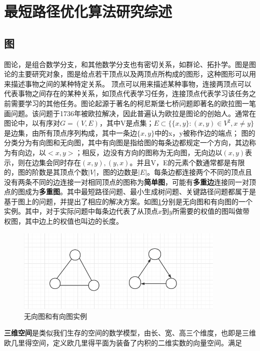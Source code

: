 \setcounter{table}{0}
\setcounter{figure}{0}
\section{最短路径优化算法研究综述}

\subsection{图}
\par 图论，是组合数学分支，和其他数学分支也有密切关系，如群论、拓扑学。图是图论的主要研究对象，图是给点若干顶点以及两顶点所构成的图形，这种图形可以用来描述事物之间的某种特定关系。
顶点可以用来描述某种事物，连接两顶点可以代表事物之间存在的某种关系，如顶点代表学习任务，连接顶点代表学习该任务之前需要学习的其他任务。图论起源于著名的柯尼斯堡七桥问题即著名的欧拉图一笔画问题。该问题于1736年被欧拉解决，因此普遍认为欧拉是图论的创始人。通常在图论中，以有序对$G=(V,E)$，其中V是点集；$E\subset \{\{x, y\}:(x,y)\in V^2,x\ne y\}$是边集，由所有顶点序列构成，其中一条边$\{x,y\}$中的x，y被称作边的端点；
图的分类分为有向图和无向图，其中有向图是指给图的每条边都规定一个方向，其边称为有向边，以$<x,y>$；相反，边没有方向的图称为无向图，无向边以$(x,y)$表示，则在边集会同时存在$(x,y),(y,x)$。并且V，E的元素个数通常都是有限的，图的阶数是其顶点个数$|V|$，图的边数是$|E|$。每条边都连接两个不同的顶点且没有两条不同的边连接一对相同顶点的图称为\textbf{简单图}，可能有\textbf{多重边}连接同一对顶点的图成为\textbf{多重图}。其中最短路径问题、最小生成树问题、关键路径问题都属于是基于图上的问题，并提出了相应的解决方案。如图\ref{fig:graph_ex}分别是无向图和有向图的一个实例。其中，对于实际问题中每条边代表了从顶点$x$到$y$所需要的权值的图叫做带权图，其中边上的权值也叫边的长度。
\begin{figure}[!htb]
  \centering
  \includegraphics[width=10cm]{figures/graph_ex.png}
  \caption{无向图和有向图实例}  
  \label{fig:graph_ex}
\end{figure}
\par\textbf{三维空间}是类似我们生存的空间的数学模型，由长、宽、高三个维度，也即是三维欧几里得空间，定义欧几里得平面为装备了内积的二维实数的向量空间。满足
